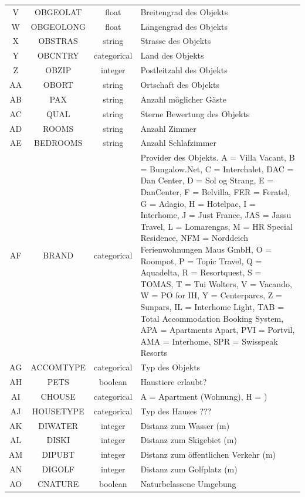 \begin{longtable}{ | c | c | c | L{7.5cm} | }
	 \\ \hline
	V & OBGEOLAT & float & Breitengrad des Objekts \\ \hline 
	W & OBGEOLONG & float & Längengrad des Objekts \\ \hline 
	X & OBSTRAS & string & Strasse des Objekts \\ \hline 
	Y & OBCNTRY & categorical & Land des Objekts \\ \hline 
	Z & OBZIP & integer & Postleitzahl des Objekts \\ \hline 
	AA & OBORT & string & Ortschaft des Objekts \\ \hline 
	AB & PAX & string & Anzahl möglicher Gäste \\ \hline 
	AC & QUAL & string & Sterne Bewertung des Objekts \\ \hline 
	AD & ROOMS & string & Anzahl Zimmer \\ \hline 
	AE & BEDROOMS & string & Anzahl Schlafzimmer \\ \hline 
	AF & BRAND & categorical & Provider des Objekts. A = Villa Vacant, B = Bungalow.Net, C = Interchalet, DAC = Dan Center, D = Sol og Strang, E = DanCenter, F = Belvilla, FER = Feratel, G = Adagio, H = Hotelpac, I = Interhome, J = Just France, JAS = Jassu Travel, L = Lomarengas, M = HR Special Residence, NFM = Norddeich Ferienwohnungen Maus GmbH, O = Roompot, P = Topic Travel, Q = Aquadelta, R = Resortquest, S = TOMAS, T = Tui Wolters, V = Vacando, W = PO for IH, Y = Centerparcs, Z = Sunpars, IL = Interhome Light, TAB = Total Accommodation Booking System, APA = Apartments Apart, PVI = Portvil, AMA = Interhome, SPR = Swisspeak Resorts\\ \hline 
	AG & ACCOMTYPE & categorical & Typ des Objekts\\ \hline 
	AH & PETS & boolean & Haustiere erlaubt? \\ \hline 
	AI & CHOUSE & categorical & A = Apartment (Wohnung), H = ) \\ \hline 
	AJ & HOUSETYPE & categorical & Typ des Hauses ??? \\ \hline 
	AK & DIWATER & integer & Distanz zum Wasser (m) \\ \hline 
	AL & DISKI & integer & Distanz zum Skigebiet (m) \\ \hline 
	AM & DIPUBT & integer & Distanz zum öffentlichen Verkehr (m) \\ \hline 
	AN & DIGOLF & integer & Distanz zum Golfplatz (m) \\ \hline 
	AO & CNATURE & boolean & Naturbelassene Umgebung \\ \hline 

\end{longtable}
